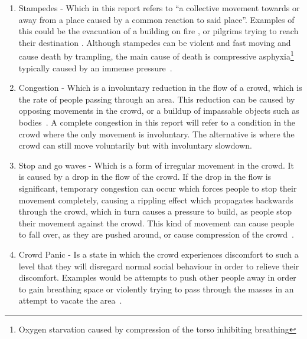 \begin{enumerate}
    \item Stampedes - Which in this report refers to \enquote{a collective movement towards or away from a place caused by a common reaction to said place}. Examples of this could be the evacuation of a building on fire \cite{website:Wikipedia-stationclubfire}, or pilgrims trying to reach their destination \cite{website:Wikipedia-minastampede}. Although stampedes can be violent and fast moving and cause death by trampling, the main cause of death is compressive asphyxia\footnote{Oxygen starvation caused by compression of the torso inhibiting breathing} typically caused by an immense pressure~\cite{fruincauses}.
    
    \item Congestion - Which is a involuntary reduction in the flow of a crowd, which is the rate of people passing through an area. This reduction can be caused by opposing movements in the crowd, or a buildup of impassable objects such as bodies~\cite{ website:Wikipedia-stationclubfire,website:Wikipedia-meccatunnel}. A complete congestion in this report will refer to a condition in the crowd where the only movement is involuntary. The alternative is where the crowd can still move voluntarily but with involuntary slowdown.
    
    
    \item Stop and go waves - Which is a form of irregular movement in the crowd. It is caused by a drop in the flow of the crowd. If the drop in the flow is significant, temporary congestion can occur which forces people to stop their movement completely, causing a rippling effect which propagates backwards through the crowd, which in turn causes a pressure to build, as people stop their movement against the crowd. This kind of movement can cause people to fall over, as they are pushed around, or cause compression of the crowd~\cite{empircalstudy,videoanalysis}.
    
    \item Crowd Panic - Is a state in which the crowd experiences discomfort to such a level that they will disregard normal social behaviour in order to relieve their discomfort. Examples would be attempts to push other people away in order to gain breathing space or violently trying to pass through the masses in an attempt to vacate the area~\cite{empircalstudy}.
\end{enumerate}


